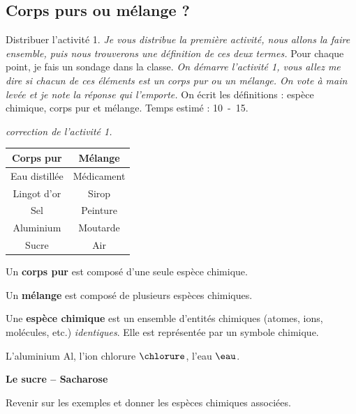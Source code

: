 \subsection{Corps purs ou mélange ?}

\begin{prior}
Distribuer l'activité 1.
\emph{Je vous distribue la première activité, nous allons la faire ensemble, puis nous trouverons une définition de ces deux termes.}
Pour chaque point, je fais un sondage dans la classe.
\emph{On démarre l'activité 1, vous allez me dire si chacun de ces éléments est un corps pur ou un mélange.
On vote à main levée et je note la réponse qui l'emporte.}
On écrit les définitions : espèce chimique, corps pur et mélange.
Temps estimé : \unit{10-15}{\minute}.
\end{prior}

\begin{exemple}
\emph{correction de l'activité 1.}
\center
\begin{tabular}{c|c}
\textbf{Corps pur} & \textbf{Mélange} \\
\hline
Eau distillée & Médicament \\
Lingot d'or   & Sirop \\
Sel           & Peinture \\
Aluminium     & Moutarde \\
Sucre         & Air
\end{tabular}
\end{exemple}

\begin{definition}
Un \textbf{corps pur} est composé d'une seule espèce chimique.

\noindent
Un \textbf{mélange} est composé de plusieurs espèces chimiques.
\end{definition}

\begin{definition}
Une \textbf{espèce chimique} est un ensemble d'entités chimiques (atomes, ions, molécules, etc.) \textit{identiques}.
Elle est représentée par un symbole chimique.
\end{definition}

\begin{exemple}
L'aluminium Al, l'ion chlorure $\chlorure$, l'eau $\eau$.
\end{exemple}

\begin{slide}
\textbf{Le sucre -- Sacharose}

\noindent
\textcolor{green_f}{Revenir sur les exemples et donner les espèces chimiques associées.}
\end{slide}


